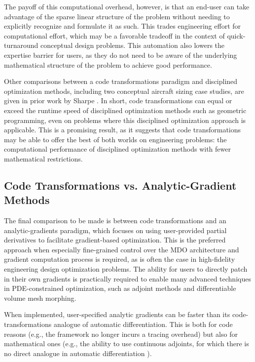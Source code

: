 The payoff of this computational overhead, however, is that an end-user can take advantage of the sparse linear structure of the problem without needing to explicitly recognize and formulate it as such. This trades engineering effort for computational effort, which may be a favorable tradeoff in the context of quick-turnaround conceptual design problems. This automation also lowers the expertise barrier for users, as they do not need to be aware of the underlying mathematical structure of the problem to achieve good performance.

Other comparisons between a code transformations paradigm and disciplined optimization methods, including two conceptual aircraft sizing case studies, are given in prior work by Sharpe \cite{sharpe_aerosandbox_2021}. In short, code transformations can equal or exceed the runtime speed of disciplined optimization methods such as geometric programming, even on problems where this disciplined optimization approach is applicable. This is a promising result, as it suggests that code transformations may be able to offer the best of both worlds on engineering problems: the computational performance of disciplined optimization methods with fewer mathematical restrictions.

\subsection{Code Transformations vs. Analytic-Gradient Methods}

The final comparison to be made is between code transformations and an analytic-gradients paradigm, which focuses on using user-provided partial derivatives to facilitate gradient-based optimization. This is the preferred approach when especially fine-grained control over the MDO architecture and gradient computation process is required, as is often the case in high-fidelity engineering design optimization problems. The ability for users to directly patch in their own gradients is practically required to enable many advanced techniques in PDE-constrained optimization, such as adjoint methods and differentiable volume mesh morphing.

When implemented, user-specified analytic gradients can be faster than its code-transformations analogue of automatic differentiation. This is both for code reasons (e.g., the framework no longer incurs a tracing overhead) but also for mathematical ones (e.g., the ability to use continuous adjoints, for which there is no direct analogue in automatic differentiation \cite{rackauckas_universal_2021, rackauckas_direct_2022}).

